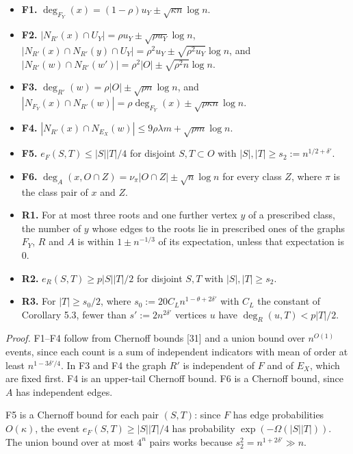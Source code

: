 \documentclass[english,11pt,a4paper]{article}
\providecommand{\tightlist}{\setlength{\itemsep}{0pt}\setlength{\parskip}{0pt}}
\begin{document}
\begin{itemize}
\tightlist
\item
  \textbf{F1.} \(\deg_{F_Y}(x)=(1-\rho)u_Y\pm\sqrt{\kappa n}\log n\).
\item
  \textbf{F2.} \(|N_{R'}(x)\cap U_Y|=\rho u_Y\pm\sqrt{\rho u_Y}\log n\), \(|N_{R'}(x)\cap N_{R'}(y)\cap U_Y|=\rho^2u_Y\pm\sqrt{\rho^2u_Y}\log n\), and \(|N_{R'}(w)\cap N_{R'}(w')|=\rho^2|O|\pm\sqrt{\rho^2n}\log n\).
\item
  \textbf{F3.} \(\deg_{R'}(w)=\rho|O|\pm\sqrt{\rho n}\log n\), and \(|N_{F_Y}(x)\cap N_{R'}(w)|=\rho\deg_{F_Y}(x)\pm\sqrt{\rho\kappa n}\log n\).
\item
  \textbf{F4.} \(|N_{R'}(x)\cap N_{E_X}(w)|\le9\rho\lambda m+\sqrt{\rho m}\log n\).
\item
  \textbf{F5.} \(e_F(S,T)\le|S||T|/4\) for disjoint \(S,T\subset O\) with \(|S|,|T|\ge s_2:=n^{1/2+\delta'}\).
\item
  \textbf{F6.} \(\deg_A(x,O\cap Z)=\nu_\pi|O\cap Z|\pm\sqrt n\log n\) for every class \(Z\), where \(\pi\) is the class pair of \(x\) and \(Z\).
\item
  \textbf{R1.} For at most three roots and one further vertex \(y\) of a prescribed class, the number of \(y\) whose edges to the roots lie in prescribed ones of the graphs \(F_Y\), \(R\) and \(A\) is within \(1\pm n^{-1/3}\) of its expectation, unless that expectation is 0.
\item
  \textbf{R2.} \(e_R(S,T)\ge p|S||T|/2\) for disjoint \(S,T\) with \(|S|,|T|\ge s_2\).
\item
  \textbf{R3.} For \(|T|\ge s_0/2\), where \(s_0:=20C_Ln^{1-\theta+2\delta'}\) with \(C_L\) the constant of Corollary 5.3, fewer than \(s':=2n^{2\delta'}\) vertices \(u\) have \(\deg_R(u,T)<p|T|/2\).
\end{itemize}

\emph{Proof.} F1--F4 follow from Chernoff bounds {[}31{]} and a union bound over \(n^{O(1)}\) events, since each count is a sum of independent indicators with mean of order at least \(n^{1-3\delta'/4}\). In F3 and F4 the graph \(R'\) is independent of \(F\) and of \(E_X\), which are fixed first. F4 is an upper-tail Chernoff bound. F6 is a Chernoff bound, since \(A\) has independent edges.

F5 is a Chernoff bound for each pair \((S,T)\): since \(F\) has edge probabilities \(O(\kappa)\), the event \(e_F(S,T)\ge|S||T|/4\) has probability \(\exp(-\Omega(|S||T|))\). The union bound over at most \(4^n\) pairs works because \(s_2^2=n^{1+2\delta'}\gg n\).
\end{document}
